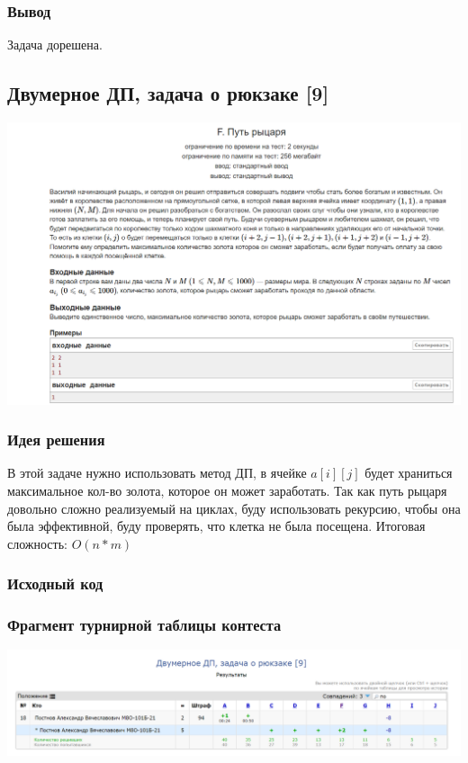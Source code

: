 \subsubsection*{Вывод}
Задача дорешена.

\vspace{20pt}

\pagebreak

\subsection*{Двумерное ДП, задача о рюкзаке [9]}
\begin{center}
\includegraphics[width=\textwidth]{statements/9.png}
\end{center}
\subsubsection*{Идея решения}
В этой задаче нужно использовать метод ДП, в ячейке $a[i][j]$ будет храниться максимальное кол-во золота, которое он может заработать. Так как путь рыцаря довольно сложно реализуемый на циклах, буду использовать рекурсию, чтобы она была эффективной, буду проверять, что клетка не была посещена. Итоговая сложность: $O(n * m)$
\subsubsection*{Исходный код}


\subsubsection*{Фрагмент турнирной таблицы контеста}
\begin{center}
\includegraphics[width=\textwidth]{standings/9.png}\newline\noindent
\end{center}

